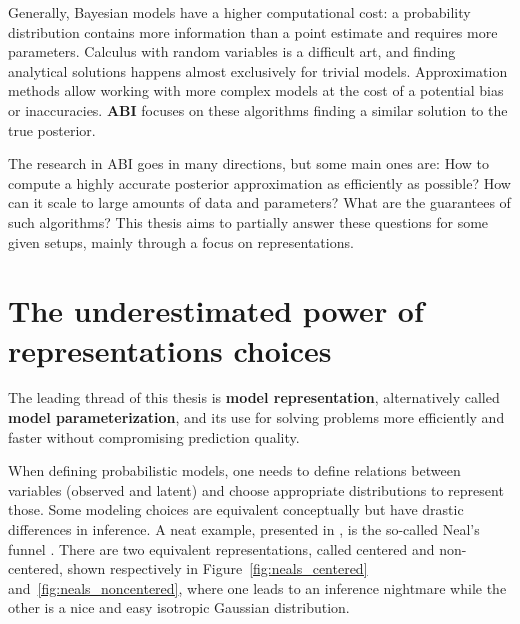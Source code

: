 Generally, Bayesian models have a higher computational cost: a probability distribution contains more information than a point estimate and requires more parameters.
Calculus with random variables is a difficult art, and finding analytical solutions happens almost exclusively for trivial models.
Approximation methods allow working with more complex models at the cost of a potential bias or inaccuracies. 
\textbf{\ac{ABI}} focuses on these algorithms finding a similar solution to the true posterior.

The research in \ac{ABI} goes in many directions, but some main ones are: How to compute a highly accurate posterior approximation as efficiently as possible? How can it scale to large amounts of data and parameters? What are the guarantees of such algorithms?
This thesis aims to partially answer these questions for some given setups, mainly through a focus on representations.

\section{The underestimated power of representations choices}

The leading thread of this thesis is \textbf{model representation}, alternatively called \textbf{model parameterization}, and its use for solving problems more efficiently and faster without compromising prediction quality.

When defining probabilistic models, one needs to define relations between variables (observed and latent) and choose appropriate distributions to represent those.
Some modeling choices are equivalent conceptually but have drastic differences in inference.
A neat example, presented in \citet{gorinovaAutomaticReparameterisationProbabilistic2020}, is the so-called Neal's funnel \cite{nealSliceSampling2003}.
There are two equivalent representations, called centered and non-centered, shown respectively in Figure~\ref{fig:neals_centered} and~\ref{fig:neals_noncentered}, where one leads to an inference nightmare while the other is a nice and easy isotropic Gaussian distribution.

